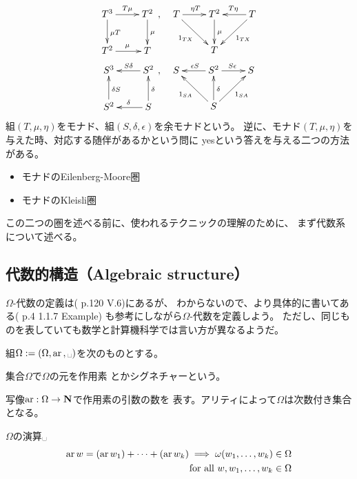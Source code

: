 {\begin{equation}
\begin{split}
		\xymatrix{
			T^3 \ar[r]^{T\mu} \ar[d]^{\mu T} & T^2 \ar[d]^{\mu} \\
			T^2 \ar[r]^{\mu} & T \\
		},\quad &\xymatrix{
			T \ar[r]^{\eta T} \ar[dr]_{1_{TX}} & T^2 \ar[d]^{\mu}
			& T \ar[l]_{T\eta} \ar[dl]^{1_{TX}} \\
			& T
		} \\
		\xymatrix{
			S^3 \ar@{<-}[r]^{S\delta} \ar@{<-}[d]^{\delta S} & S^2 \ar@{<-}[d]^{\delta} \\
			S^2 \ar@{<-}[r]^{\delta} & S \\
		},\quad &\xymatrix{
			S \ar@{<-}[r]^{\epsilon S} \ar@{<-}[dr]_{1_{SA}} & S^2 \ar@{<-}[d]^{\delta}
			& S \ar@{<-}[l]_{S\epsilon} \ar@{<-}[dl]^{1_{SA}} \\
			& S
		} \\
	\end{split}\end{equation}
	組$(T,\mu,\eta)$をモナド、組$(S,\delta,\epsilon)$を余モナドという。
	逆に、モナド$(T,\mu,\eta)$を与えた時、対応する随伴があるかという問に
	yesという答えを与える二つの方法がある。
	\begin{itemize}\setlength{\itemsep}{-1mm} %
		\item モナドのEilenberg-Moore圏
		\item モナドのKleisli圏
	\end{itemize} %
	この二つの圏を述べる前に、使われるテクニックの理解のために、
	まず代数系について述べる。
\subsection{代数的構造（Algebraic structure）}\label{s2:代数的構造} %
	$\Omega$-代数の定義は(\cite{maclane.work} p.120 V.6)にあるが、
	わからないので、より具体的に書いてある(\cite{PIERCE91} p.4 1.1.7 Example)
	も参考にしながら$\Omega$-代数を定義しよう。
	ただし、同じものを表していても数学と計算機科学では言い方が異なるようだ。

	組$\Omega:=(\Omega,\op{ar},\myspace)$を次のものとする。
	\begin{description}\setlength{\itemsep}{-1mm} %
		\item[作用素] 集合$\Omega$で$\Omega$の元を作用素\cite{maclane.work}
		とかシグネチャー\cite{PIERCE91}という。
		\item[アリティ] 写像$\mathinner{{\operatorname{ar}}}:\Omega\to\mathbf{N}$で作用素の引数の数を
		表す。アリティによって$\Omega$は次数付き集合となる。
		\item[合成] $\Omega$の演算$\myspace$
		\begin{equation*}\begin{split}
			\mathinner{{\operatorname{ar}}}w= (\mathinner{{\operatorname{ar}}}w_1) +\cdots+ (\mathinner{{\operatorname{ar}}}w_k)
			\implies \omega(w_1,\dots,w_k)\in\Omega \\
			\quad\text{for all } w,w_1,\dots,w_k\in\Omega
		\end{split}\end{equation*}
	\end{description} %

}
